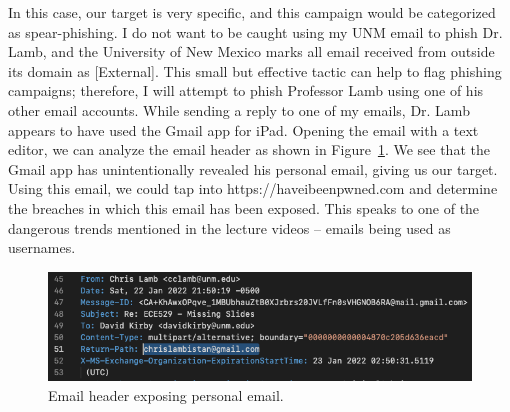 \documentclass[12pt]{article}
\begin{document}
In this case, our target is very specific, and this campaign would be categorized as spear-phishing. I do not want to be caught using my UNM email to phish Dr. Lamb, and the University of New Mexico marks all email received from outside its domain as [External]. This small but effective tactic can help to flag phishing campaigns; therefore, I will attempt to phish Professor Lamb using one of his other email accounts. While sending a reply to one of my emails, Dr. Lamb appears to have used the Gmail app for iPad. Opening the email with a text editor, we can analyze the email header as shown in Figure~\ref{fig:email}. We see that the Gmail app has unintentionally revealed his personal email, giving us our target. Using this email, we could tap into https://haveibeenpwned.com and determine the breaches in which this email has been exposed. This speaks to one of the dangerous trends mentioned in the lecture videos -- emails being used as usernames.
\begin{figure}[!ht]
    \centering
    \includegraphics[width=\textwidth]{figure01.png}%
    \caption{Email header exposing personal email.}
    \label{fig:email}
\end{figure}
\end{document}
